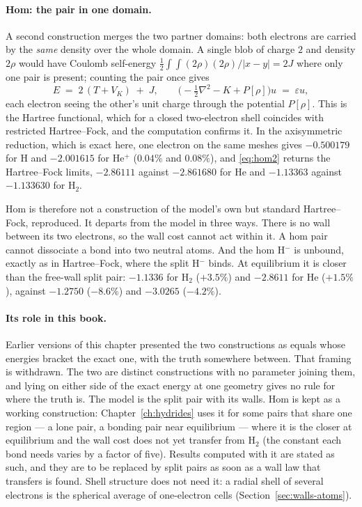 \paragraph{Hom: the pair in one domain.} A second construction merges the two partner domains: both
electrons are carried by the \emph{same} density over the whole domain. A single blob of charge $2$
and density $2\rho$ would have Coulomb self-energy $\tfrac12\!\int\!\!\int(2\rho)(2\rho)/|x-y| = 2J$ where
only one pair is present; counting the pair once gives
\begin{equation}
E \;=\; 2\,(T + V_K) \;+\; J, \qquad
\bigl(-\tfrac12\nabla^2 - K + P[\rho]\bigr)u \;=\; \varepsilon u ,
\label{eq:hom2}
\end{equation}
each electron seeing the other's unit charge through the potential $P[\rho]$. This is the Hartree
functional, which for a closed two-electron shell coincides with restricted Hartree--Fock, and the
computation confirms it. In the axisymmetric reduction, which is exact here, one electron on the same
meshes gives $-0.500179$ for H and $-2.001615$ for He$^+$ ($0.04\%$ and $0.08\%$), and \eqref{eq:hom2}
returns the Hartree--Fock limits, $-2.86111$ against $-2.861680$ for He and $-1.13363$ against
$-1.133630$ for H$_2$.

Hom is therefore not a construction of the model's own but standard Hartree--Fock, reproduced. It
departs from the model in three ways. There is no wall between its two electrons, so the wall cost
cannot act within it. A hom pair cannot dissociate a bond into two neutral atoms. And the hom H$^-$ is
unbound, exactly as in Hartree--Fock, where the split H$^-$ binds. At equilibrium it is closer than
the free-wall split pair: $-1.1336$ for H$_2$ ($+3.5\%$) and $-2.8611$ for He ($+1.5\%$), against
$-1.2750$ ($-8.6\%$) and $-3.0265$ ($-4.2\%$).

\paragraph{Its role in this book.} Earlier versions of this chapter presented the two constructions
as equals whose energies bracket the exact one, with the truth somewhere between. That framing is
withdrawn. The two are distinct constructions with no parameter joining them, and lying on either
side of the exact energy at one geometry gives no rule for where the truth is. The model is the split
pair with its walls. Hom is kept as a working construction: Chapter~\ref{ch:hydrides} uses it for
some pairs that share one region --- a lone pair, a bonding pair near equilibrium --- where it is the
closer at equilibrium and the wall cost does not yet transfer from H$_2$ (the constant each bond needs
varies by a factor of five). Results computed with it are stated as such, and they are to be replaced
by split pairs as soon as a wall law that transfers is found. Shell structure does not need it: a
radial shell of several electrons is the spherical average of one-electron cells
(Section~\ref{sec:walls-atoms}).

